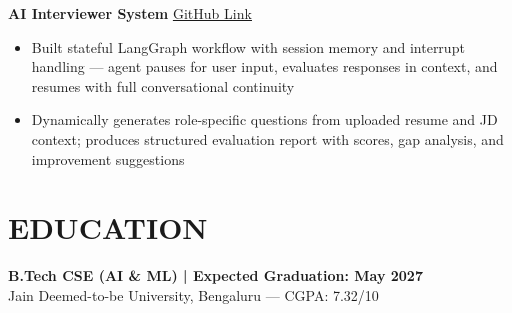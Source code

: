 \documentclass[9.5pt,a4paper]{article}
\begin{document}
\textbf{AI Interviewer System} \hfill
\href{https://github.com/prabhavjain2004/ai-interviewer}{\underline{GitHub Link}}
\begin{itemize}
\item Built stateful LangGraph workflow with session memory and interrupt handling --- agent pauses for user input, evaluates responses in context, and resumes with full conversational continuity
\item Dynamically generates role-specific questions from uploaded resume and JD context; produces structured evaluation report with scores, gap analysis, and improvement suggestions
\end{itemize}

\section*{EDUCATION}
\textbf{B.Tech CSE (AI \& ML) | Expected Graduation: May 2027}\\
Jain Deemed-to-be University, Bengaluru --- CGPA: 7.32/10
\end{document}
